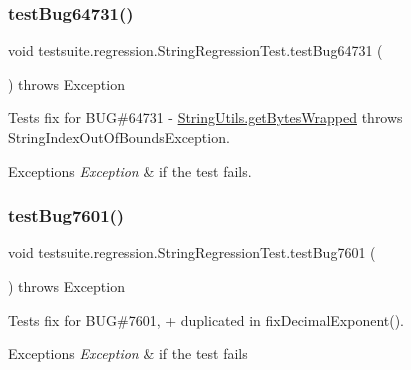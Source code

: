 \subsubsection{\texorpdfstring{test\+Bug64731()}{testBug64731()}}
{\footnotesize\ttfamily void testsuite.\+regression.\+String\+Regression\+Test.\+test\+Bug64731 (\begin{DoxyParamCaption}{ }\end{DoxyParamCaption}) throws Exception}

Tests fix for B\+UG\#64731 -\/ \mbox{\hyperlink{classcom_1_1mysql_1_1cj_1_1util_1_1_string_utils_aa586cd6c16fa10c7a9d6f29d06fcfd9d}{String\+Utils.\+get\+Bytes\+Wrapped}} throws String\+Index\+Out\+Of\+Bounds\+Exception.


\begin{DoxyExceptions}{Exceptions}
{\em Exception} & if the test fails. \\
\hline
\end{DoxyExceptions}
\mbox{\label{classtestsuite_1_1regression_1_1_string_regression_test_a7daa6aace5462393758a0ccdcb6dd4c9}} 
\subsubsection{\texorpdfstring{test\+Bug7601()}{testBug7601()}}
{\footnotesize\ttfamily void testsuite.\+regression.\+String\+Regression\+Test.\+test\+Bug7601 (\begin{DoxyParamCaption}{ }\end{DoxyParamCaption}) throws Exception}

Tests fix for B\+UG\#7601, \textquotesingle{}+\textquotesingle{} duplicated in fix\+Decimal\+Exponent().


\begin{DoxyExceptions}{Exceptions}
{\em Exception} & if the test fails \\
\hline
\end{DoxyExceptions}
\mbox{\label{classtestsuite_1_1regression_1_1_string_regression_test_a4d94b374bdd0e09b4ecc7e541d5780ac}} 

